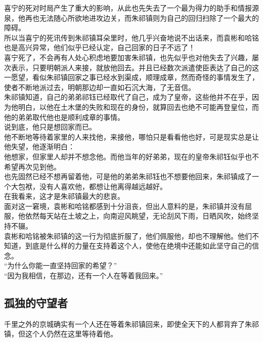 \begin{multicols}{\theparacolNo}
喜宁的死对时局产生了重大的影响，从此也先失去了一个最为得力的助手和情报源泉，他再也无法随心所欲地进攻边关，而朱祁镇则为自己的回归扫除了一个最大的障碍。\\

所以当喜宁的死讯传到朱祁镇耳朵里时，他几乎兴奋地说不出话来，而袁彬和哈铭也是高兴异常，他们似乎已经认定，自己回家的日子不远了！\\

喜宁死了，不会再有人处心积虑地要加害朱祁镇，也先似乎也对他失去了兴趣，屡次表示，只要明朝派人来接，就放他回去。并且已经数次派遣使臣表达了自己的这一愿望，看似朱祁镇回家之事已经水到渠成，顺理成章，然而奇怪的事情发生了，使者不断地派过去，明朝那边却一直如石沉大海，了无音信。\\

朱祁镇知道，自己的弟弟祁钰已经取代了自己，成为了皇帝，这些他并不在乎，因为他明白，以他在土木堡的失败和现在的身份，就算回去也绝不可能再登皇位，而他的弟弟取代他也是顺利成章的事情。\\

说到底，他只是想回家而已。\\

他不断地等待着家里的人来找他，来接他，哪怕只是看看他也好，可是现实总是让他失望，他逐渐明白：\\

他想家，但家里人却并不想念他。而他当年的好弟弟，现在的皇帝朱祁钰似乎也不希望再次见到他。\\

也先固然已经不想再留着他，可是他的弟弟朱祁钰也不想要他回来，朱祁镇成了一个大包袱，没有人喜欢他，都想让他离得越远越好。\\

在我看来，这才是朱祁镇最大的悲哀。\\

面对这一窘境，袁彬和哈铭都感到十分沮丧，但出人意料的是，朱祁镇并没有屈服，他依然每天站在土坡之上，向南迎风眺望，无论刮风下雨，日晒风吹，始终坚持不辍。\\

袁彬和哈铭被朱祁镇的这一行为彻底折服了，他们佩服他，却也不理解他。他们不知道，到底是什么样的力量在支持着这个人，使他在绝境中还能如此坚守自己的信念。\\

“为什么你能一直坚持回家的希望？”\\

“因为我相信，在那边，还有一个人在等着我回来。”\\

\subsection{孤独的守望者}
千里之外的京城确实有一个人还在等着朱祁镇回来，即使全天下的人都背弃了朱祁镇，但这个人仍然在这里等待着他。\\


\end{multicols}

